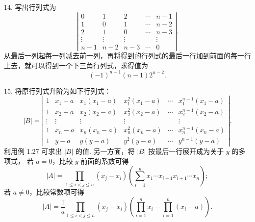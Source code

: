 \documentclass[UTF8,12pt,a4paper,fontset=fandol]{ctexart}
\begin{document}
14. 写出行列式为
\[
\left|\begin{array}{ccccc}
0&1&2&\cdots&n-1\\
1&0&1&\cdots&n-2\\
2&1&0&\cdots&n-3\\
\vdots&\vdots&\vdots&&\vdots\\
n-1&n-2&n-3&\cdots&0
\end{array}\right|.
\]
从最后一列起每一列减去前一列，再将得到的行列式的最后一行加到前面的每一行上去，就可以得到一个下三角行列式，求得值为
\[
(-1)^{n-1}(n-1)2^{n-2}.
\]

15. 将原行列式升阶为如下行列式：
\[
|B|=\left|\begin{array}{cccccc}
1&x_1-a&x_1(x_1-a)&x_1^2(x_1-a)&\cdots&x_1^{n-1}(x_1-a)\\
1&x_2-a&x_2(x_2-a)&x_2^2(x_2-a)&\cdots&x_2^{n-1}(x_2-a)\\
\vdots&\vdots&\vdots&\vdots&&\vdots\\
1&x_n-a&x_n(x_n-a)&x_n^2(x_n-a)&\cdots&x_n^{n-1}(x_n-a)\\
1&y-a&y(y-a)&y^2(y-a)&\cdots&y^{n-1}(y-a)
\end{array}\right|.
\]
利用例 1.27 可求出 $|B|$ 的值. 另一方面，将 $|B|$ 按最后一行展开成为关于 $y$ 的多项式，
若 $a=0$，比较 $y$ 前面的系数可得
\[
|A|=\prod_{1\le i<j\le n}(x_j-x_i)\left(\sum_{i=1}^n x_1\cdots x_{i-1}x_{i+1}\cdots x_n\right);
\]
若 $a\ne0$，比较常数项可得
\[
|A|=\frac1a\prod_{1\le i<j\le n}(x_j-x_i)
\left(\prod_{i=1}^n x_i-\prod_{i=1}^n(x_i-a)\right).
\]
\end{document}
